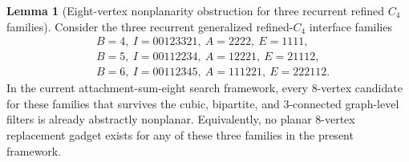 \documentclass[12pt]{article}
\theoremstyle{definition}
\newtheorem{lemma}[theorem]{Lemma}
\begin{document}
\begin{lemma}[Eight-vertex nonplanarity obstruction for three recurrent refined $C_4$ families]
\label{lem:refined-c4-nonplanarity-obstruction}
Consider the three recurrent generalized refined-$C_4$ interface families
\[
\begin{aligned}
&B=4,\ I=00123321,\ A=2222,\ E=1111,\\
&B=5,\ I=00112234,\ A=12221,\ E=21112,\\
&B=6,\ I=00112345,\ A=111221,\ E=222112.
\end{aligned}
\]
In the current attachment-sum-eight search framework, every $8$-vertex candidate for these families that survives the cubic, bipartite, and $3$-connected graph-level filters is already abstractly nonplanar. Equivalently, no planar $8$-vertex replacement gadget exists for any of these three families in the present framework.
\end{lemma}
\end{document}
